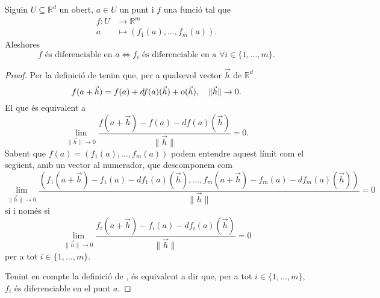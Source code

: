 \documentclass[../Apunts.tex]{subfiles}
\begin{document}
	\begin{proposition}\label{prop:diferenciable iff components diferenciables}
		Siguin \(U\subseteq\mathbb{R}^{d}\) un obert, \(a\in U\) un punt i \(f\) una funció tal que
		\begin{align*}
		f\colon U&\longrightarrow\mathbb{R}^{m}\\
		a&\longmapsto(f_{1}(a),\dots,f_{m}(a)).
		\end{align*}
		Aleshores
		\[f\text{ és diferenciable en }a\Leftrightarrow f_{i}\text{ és diferenciable en a }\forall i\in \{1,\dots,m\}.\]
		\begin{proof}
			Per la definició de  tenim que, per a qualsevol vector \(\vec{h}\) de \(\mathbb{R}^d\)
			\[f(a+\vec{h})=f(a)+df(a)(\vec{h})+\operatorname{o}(\vec{h}),\quad \lVert\vec{h}\rVert\to0.\]
			El que és equivalent a
			\[\lim_{\lVert\vec{h}\rVert\to0}\frac{f(a+\vec{h})-f(a)-df(a)(\vec{h})}{\lVert\vec{h}\rVert}=0.\]
			Sabent que \(f(a)=(f_{1}(a),\dots,f_{m}(a))\) podem entendre aquest límit com el següent, amb un vector al numerador, que descomponem com
			\[\lim_{\lVert\vec{h}\rVert\to0}\frac{(f_{1}(a+\vec{h})-f_{1}(a)-df_{1}(a)(\vec{h}),\dots,f_{m}(a+\vec{h})-f_{m}(a)-df_{m}(a)(\vec{h}))}{\lVert\vec{h}\rVert}=0\]
			si i només si%
			\[\lim_{\lVert\vec{h}\rVert\to0}\frac{f_{i}(a+\vec{h})-f_{i}(a)-df_{i}(a)(\vec{h})}{\lVert\vec{h}\rVert}=0\]
			per a tot \(i\in\{1,\dots,m\}\).
			
			Tenint en compte la definició de , és equivalent a dir que, per a tot \(i\in\{1,\dots,m\}\), \(f_{i}\) és diferenciable en el punt \(a\).
		\end{proof}
	\end{proposition}
\end{document}
